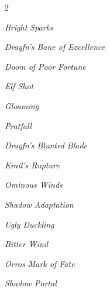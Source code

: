 \documentclass[10pt,a4paper,twoside,bg=print,twocolumn,openany,nodeprecatedcode]{dndbook}
\begin{document}
\begin{description}
\begin{multicols}{2}
{\par \vspace { 9pt plus 3pt minus 3pt } \noindent  {} \nopagebreak }

\begin{description}
\item \textit{Bright Sparks}
\item \textit{Drayfn's Bane of Excellence}
\end{description}

{\par \vspace { 9pt plus 3pt minus 3pt } \noindent  {} \nopagebreak }

\begin{description}
\item \textit{Doom of Poor Fortune}
\item \textit{Elf Shot}
\item \textit{Gloaming}
\item \textit{Pratfall}
\end{description}

{\par \vspace { 9pt plus 3pt minus 3pt } \noindent  {} \nopagebreak }

\begin{description}
\item \textit{Drayfn's Blunted Blade}
\item \textit{Krail's Rupture}
\item \textit{Ominous Winds}
\item \textit{Shadow Adaptation}
\item \textit{Ugly Duckling}
\end{description}

{\par \vspace { 9pt plus 3pt minus 3pt } \noindent  {} \nopagebreak }

\begin{description}
\item \textit{Bitter Wind}
\item \textit{Orros Mark of Fate}
\item \textit{Shadow Portal}
\end{description}

{\par \vspace { 9pt plus 3pt minus 3pt } \noindent  {} \nopagebreak }


\end{multicols}
\end{description}
\end{document}
